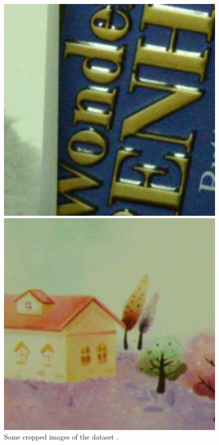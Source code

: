 \documentclass[10pt,twocolumn,letterpaper]{article}
\begin{document}
\begin{figure}[t]
{\begin{minipage}{0.055\textwidth}
\end{minipage}
\begin{minipage}{0.055\textwidth}
\includegraphics[width=1\textwidth]{images/resize_CC_Noisy_Nikon_D800_ISO_6400_B3_95.png}
\end{minipage}
\begin{minipage}{0.055\textwidth}
\includegraphics[width=1\textwidth]{images/resize_CC_Noisy_Nikon_D800_ISO_3200_A2_80.png}
\end{minipage}
}
\caption{Some cropped images of the dataset \cite{crosschannel2016}.}
\label{fig5}
\end{figure}
\end{document}
